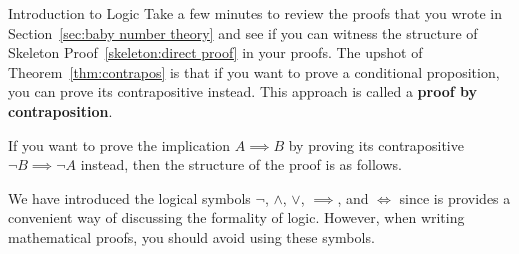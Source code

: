 \begin{section}{Introduction to Logic}
Take a few minutes to review the proofs that you wrote in Section~\ref{sec:baby number theory} and see if you can witness the structure of Skeleton Proof~\ref{skeleton:direct proof} in your proofs. The upshot of Theorem~\ref{thm:contrapos} is that if you want to prove a conditional proposition, you can prove its contrapositive instead. This approach is called a \textbf{proof by contraposition}.

\begin{skeleton}\label{pf by contraposition}
If you want to prove the implication $A\implies B$ by proving its contrapositive $\neg B\implies \neg A$ instead, then the structure of the proof is as follows.

\begin{center}
\end{center}
\end{skeleton}

We have introduced the logical symbols $\neg$, $\wedge$, $\vee$, $\implies$, and $\iff$  since is provides a convenient way of discussing the formality of logic.  However, when writing mathematical proofs, you should avoid using these symbols.


\end{section}
